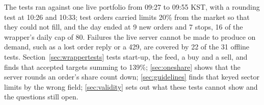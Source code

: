 \seclabel
{}

 The tests ran against one live portfolio from 09:27 to 09:55 KST, with a rounding test at 10:26 and 10:33; test orders carried limits 20\% from the market so that they could not fill, and the day ended at 9 new orders and 7 stops, 16 of the wrapper's daily cap of 80. Failures the live server cannot be made to produce on demand, such as a lost order reply or a 429, are covered by 22 of the 31 offline tests. Section~\ref{sec:wrappertests} tests start-up, the feed, a buy and a sell, and finds that  accepted targets summing to 139\%; \ref{sec:oneshare} shows that the server rounds an order's share count down; \ref{sec:guidelines} finds that  keyed sector limits by the wrong field; \ref{sec:validity} sets out what these tests cannot show and the questions still open.
